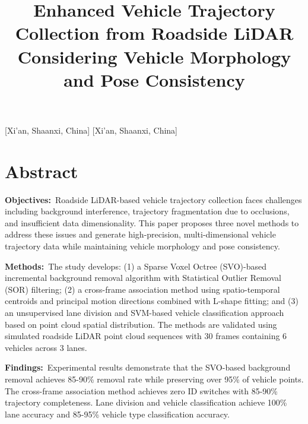 \documentclass[numbered]{trbunofficial}
\begin{document}

\title{Enhanced Vehicle Trajectory Collection from Roadside LiDAR Considering Vehicle Morphology and Pose Consistency}

[Xi'an, Shaanxi, China]
[Xi'an, Shaanxi, China]


\maketitle

\section{Abstract}

\noindent\textbf{Objectives:}~Roadside LiDAR-based vehicle trajectory collection faces challenges including background interference, trajectory fragmentation due to occlusions, and insufficient data dimensionality. This paper proposes three novel methods to address these issues and generate high-precision, multi-dimensional vehicle trajectory data while maintaining vehicle morphology and pose consistency.

\hfill\break%
\noindent\textbf{Methods:}~The study develops: (1) a Sparse Voxel Octree (SVO)-based incremental background removal algorithm with Statistical Outlier Removal (SOR) filtering; (2) a cross-frame association method using spatio-temporal centroids and principal motion directions combined with L-shape fitting; and (3) an unsupervised lane division and SVM-based vehicle classification approach based on point cloud spatial distribution. The methods are validated using simulated roadside LiDAR point cloud sequences with 30 frames containing 6 vehicles across 3 lanes.

\hfill\break%
\noindent\textbf{Findings:}~Experimental results demonstrate that the SVO-based background removal achieves 85-90\% removal rate while preserving over 95\% of vehicle points. The cross-frame association method achieves zero ID switches with 85-90\% trajectory completeness. Lane division and vehicle classification achieve 100\% lane accuracy and 85-95\% vehicle type classification accuracy.
\end{document}
